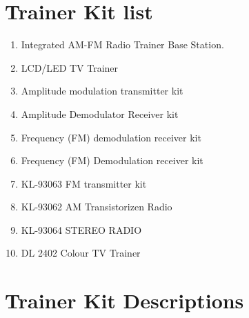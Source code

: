 \documentclass[a4paper,12pt]{article}
\begin{document}
		
		
		\section{Trainer Kit list }
		\begin{enumerate}
					\item	Integrated AM-FM Radio Trainer Base Station.
			\item   LCD/LED TV Trainer
			\item	Amplitude modulation transmitter kit
			\item	Amplitude Demodulator Receiver kit
			\item	Frequency (FM) demodulation receiver kit
			\item	Frequency (FM) Demodulation receiver kit
			\item	KL-93063 FM transmitter kit
			\item	KL-93062 AM Transistorizen Radio
			\item	KL-93064 STEREO RADIO
			\item	DL 2402 Colour TV Trainer
		\end{enumerate}

		\section{Trainer Kit Descriptions}
		
\end{document}
